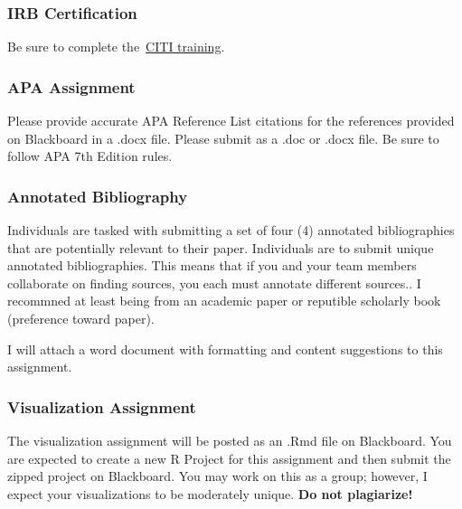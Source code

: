 \documentclass[
  b5paper]{book}
\begin{document}
\hypertarget{irb-certification}{%
\subsubsection*{IRB Certification}\label{irb-certification}}

Be sure to complete the~\href{https://www.citiprogram.org/Shibboleth.sso/Login?target=https\%3A\%2F\%2Fwww.citiprogram.org\%2FSecure\%2FWelcome.cfm?inst=551\&entityID=https\%3A\%2F\%2Fsts.windows.net\%2F99f37d21-0b5c-43ea-9103-e16f02f5aecf\%2F}{CITI training}.

\hypertarget{apa-assignment}{%
\subsubsection*{APA Assignment}\label{apa-assignment}}

Please provide accurate APA Reference List citations for the references provided on Blackboard in a .docx file. Please submit as a .doc or .docx file. Be sure to follow APA 7th Edition rules.

\hypertarget{annotated-bibliography}{%
\subsubsection*{Annotated Bibliography}\label{annotated-bibliography}}

Individuals are tasked with submitting a set of four (4) annotated bibliographies that are potentially relevant to their paper. Individuals are to submit unique annotated bibliographies. This means that if you and your team members collaborate on finding sources, you each must annotate different sources.. I recommned at least being from an academic paper or reputible scholarly book (preference toward paper).

I will attach a word document with formatting and content suggestions to this assignment.

\hypertarget{visualization-assignment}{%
\subsubsection*{Visualization Assignment}\label{visualization-assignment}}

The visualization assignment will be posted as an .Rmd file on Blackboard. You are expected to create a new R Project for this assignment and then submit the zipped project on Blackboard. You may work on this as a group; however, I expect your visualizations to be moderately unique. \textbf{Do not plagiarize!}
\end{document}

